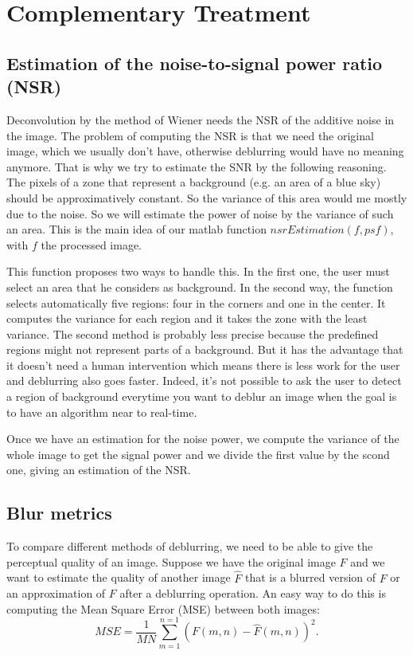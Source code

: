 \section{Complementary Treatment}
\label{sec:CompTr}
\subsection{Estimation of the noise-to-signal power ratio (NSR)}
\label{subsec:NSREstimation}
Deconvolution by the method of Wiener needs the NSR of the additive noise in the image. The problem of computing the NSR is that we need the original image, which we usually don't have, otherwise deblurring would have no meaning anymore. That is why we try to estimate the SNR by the following reasoning. The pixels of a zone that represent a background (e.g. an area of a blue sky) should be approximatively constant. So the variance of this area would me mostly due to the noise. So we will estimate the power of noise by the variance of such an area. This is the main idea of our matlab function $nsrEstimation(f,psf)$, with $f$ the processed image. %

This function proposes two ways to handle this. In the first one, the user must select an area that he considers as background. In the second way, the function selects automatically five regions: four in the corners and one in the center. It computes the variance for each region and it takes the zone with the least variance. The second method is probably less precise because the predefined regions might not represent parts of a background. But it has the advantage that it doesn't need a human intervention which means there is less work for the user and deblurring also goes faster. Indeed, it's not possible to ask the user to detect a region of background everytime you want to deblur an image when the goal is to have an algorithm near to real-time.

Once we have an estimation for the noise power, we compute the variance of the whole image to get the signal power and we divide the first value by the scond one, giving an estimation of the NSR.


\subsection{Blur metrics}

To compare different methods of deblurring, we need to be able to give the perceptual quality of an image. Suppose we have the original image $F$ and we want to estimate the quality of another image $\hat{F}$ that is a blurred version of $F$ or an approximation of $F$ after a deblurring operation. An easy way to do this is computing the Mean Square Error (MSE) between both images:
\begin{equation}
MSE=\frac{1}{MN} \sum\limits_{m=1}^{n=1}\left(F(m,n)-\hat{F}(m,n)\right)^2.
\end{equation}


